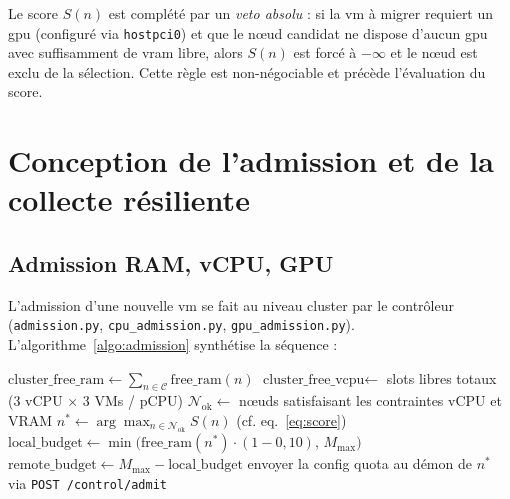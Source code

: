 Le score $S(n)$ est complété par un \emph{veto absolu} : si la \acrshort{vm} à migrer requiert un \acrshort{gpu} (configuré via \texttt{hostpci0}) et que le nœud candidat ne dispose d'aucun \acrshort{gpu} avec suffisamment de \acrshort{vram} libre, alors $S(n)$ est forcé à $-\infty$ et le nœud est exclu de la sélection. Cette règle est non-négociable et précède l'évaluation du score.

\section{Conception de l'admission et de la collecte résiliente}
\label{sec:conception-admission}

\subsection{Admission RAM, vCPU, GPU}

L'admission d'une nouvelle \acrshort{vm} se fait au niveau cluster par le contrôleur (\texttt{admission.py}, \texttt{cpu\_admission.py}, \texttt{gpu\_admission.py}). L'algorithme~\ref{algo:admission} synthétise la séquence :

\begin{algorithm}[H]
\caption{Admission d'une nouvelle VM (vue cluster-wide)}
\label{algo:admission}
$\text{cluster\_free\_ram} \gets \sum_{n \in \mathcal{C}} \text{free\_ram}(n)$\;
$\text{cluster\_free\_vcpu} \gets$ slots libres totaux (3 vCPU × 3 VMs / pCPU)\;
$\mathcal{N}_{\text{ok}} \gets$ nœuds satisfaisant les contraintes vCPU et VRAM\;
$n^* \gets \arg\max_{n \in \mathcal{N}_{\text{ok}}} S(n)$ (cf. eq.~\ref{eq:score})\;
$\text{local\_budget} \gets \min\!\bigl(\text{free\_ram}(n^*) \cdot (1 - 0{,}10),\, M_{\max}\bigr)$\;
$\text{remote\_budget} \gets M_{\max} - \text{local\_budget}$\;
envoyer la config quota au démon de $n^*$ via \texttt{POST /control/admit}\;
\;
\end{algorithm}


